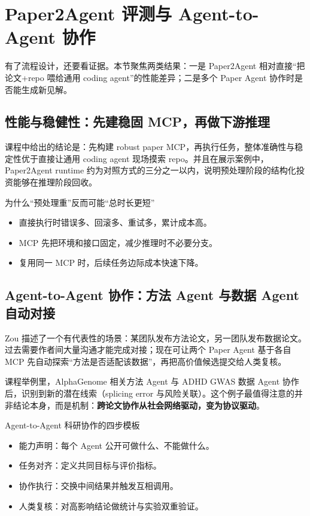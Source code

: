 \section{Paper2Agent 评测与 Agent-to-Agent 协作}

有了流程设计，还要看证据。本节聚焦两类结果：一是 Paper2Agent 相对直接``把论文+repo 喂给通用 coding agent''的性能差异；二是多个 Paper Agent 协作时是否能生成新见解。

\subsection{性能与稳健性：先建稳固 MCP，再做下游推理}

课程中给出的结论是：先构建 robust paper MCP，再执行任务，整体准确性与稳定性优于直接让通用 coding agent 现场摸索 repo。并且在展示案例中，Paper2Agent runtime 约为对照方式的三分之一以内，说明预处理阶段的结构化投资能够在推理阶段回收。

\begin{importantbox}{为什么``预处理重''反而可能``总时长更短''}
\begin{itemize}
    \item 直接执行时错误多、回滚多、重试多，累计成本高。
    \item MCP 先把环境和接口固定，减少推理时不必要分支。
    \item 复用同一 MCP 时，后续任务边际成本快速下降。
\end{itemize}
\end{importantbox}

\subsection{Agent-to-Agent 协作：方法 Agent 与数据 Agent 自动对接}

Zou 描述了一个有代表性的场景：某团队发布方法论文，另一团队发布数据论文。过去需要作者间大量沟通才能完成对接；现在可让两个 Paper Agent 基于各自 MCP 先自动探索``方法是否适配该数据''，再把高价值候选提交给人类复核。

课程举例里，AlphaGenome 相关方法 Agent 与 ADHD GWAS 数据 Agent 协作后，识别到新的潜在线索（splicing error 与风险关联）。这个例子最值得注意的并非结论本身，而是机制：\textbf{跨论文协作从社会网络驱动，变为协议驱动}。

\begin{knowledgebox}{Agent-to-Agent 科研协作的四步模板}
\begin{itemize}
    \item 能力声明：每个 Agent 公开可做什么、不能做什么。
    \item 任务对齐：定义共同目标与评价指标。
    \item 协作执行：交换中间结果并触发互相调用。
    \item 人类复核：对高影响结论做统计与实验双重验证。
\end{itemize}
\end{knowledgebox}

